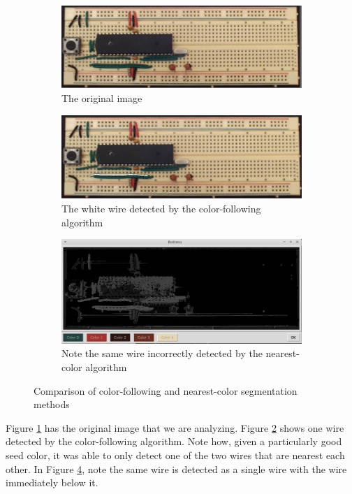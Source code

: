 \documentclass[10pt,twocolumn,letterpaper]{article}
\begin{document}
\begin{figure}[ht]
\centering
\begin{subfigure}[b]{\linewidth}
	\centering
   \includegraphics[width=0.9\linewidth]{demos/original_of_comp.png}
	\caption{The original image}
	\label{fig:origcomp}
\end{subfigure}
\begin{subfigure}[b]{\linewidth}
	\centering
   \includegraphics[width=0.9\linewidth]{demos/single_wire_not_double.png}
	\caption{The white wire detected by the color-following algorithm}
	\label{fig:cfollow}
\end{subfigure}
\begin{subfigure}[b]{\linewidth}
	\centering
   \includegraphics[width=0.9\linewidth]{demos/closest_color.png}
   \caption{Note the same wire incorrectly detected by the nearest-color algorithm}
	\label{fig:ncolor}
\end{subfigure}
\caption{Comparison of color-following and nearest-color segmentation methods}
\end{figure}

Figure \ref{fig:origcomp} has the original image that we are analyzing. Figure
\ref{fig:cfollow} shows one wire detected by the color-following algorithm.
Note how, given a particularly good seed color, it was able to only detect one
of the two wires that are nearest each other. In Figure \ref{fig:ncolor}, note
the same wire is detected as a single wire with the wire immediately below it. 
\end{document}
